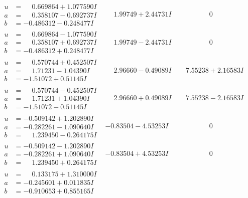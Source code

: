\documentclass[1p]{elsarticle_modified}
\theoremstyle{definition}
\begin{document}
$$\begin{array}{c|c|c}
\begin{aligned}
u &= \phantom{-}0.669864 + 1.077590 I \\
a &= \phantom{-}0.358107 - 0.692737 I \\
b &= -0.486312 - 0.248477 I\end{aligned}
 & \phantom{-}1.99749 + 2.44731 I & \phantom{-0.000000 } 0 \\ \hline\begin{aligned}
u &= \phantom{-}0.669864 - 1.077590 I \\
a &= \phantom{-}0.358107 + 0.692737 I \\
b &= -0.486312 + 0.248477 I\end{aligned}
 & \phantom{-}1.99749 - 2.44731 I & \phantom{-0.000000 } 0 \\ \hline\begin{aligned}
u &= \phantom{-}0.570744 + 0.452507 I \\
a &= \phantom{-}1.71231 - 1.04390 I \\
b &= -1.51072 + 0.51145 I\end{aligned}
 & \phantom{-}2.96660 - 0.49089 I & \phantom{-}7.55238 + 2.16583 I \\ \hline\begin{aligned}
u &= \phantom{-}0.570744 - 0.452507 I \\
a &= \phantom{-}1.71231 + 1.04390 I \\
b &= -1.51072 - 0.51145 I\end{aligned}
 & \phantom{-}2.96660 + 0.49089 I & \phantom{-}7.55238 - 2.16583 I \\ \hline\begin{aligned}
u &= -0.509142 + 1.202890 I \\
a &= -0.282261 - 1.090640 I \\
b &= \phantom{-}1.239450 - 0.264175 I\end{aligned}
 & -0.83504 - 4.53253 I & \phantom{-0.000000 } 0 \\ \hline\begin{aligned}
u &= -0.509142 - 1.202890 I \\
a &= -0.282261 + 1.090640 I \\
b &= \phantom{-}1.239450 + 0.264175 I\end{aligned}
 & -0.83504 + 4.53253 I & \phantom{-0.000000 } 0 \\ \hline\begin{aligned}
u &= \phantom{-}0.133175 + 1.310000 I \\
a &= -0.245601 + 0.011835 I \\
b &= -0.910653 + 0.855165 I\end{aligned}

\end{array}$$
\end{document}
